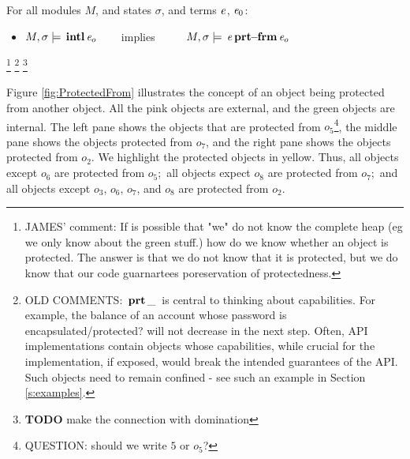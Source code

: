  
\begin{lemma}
\label{lemma:internalProtects}
For all modules $M$, and states $\sigma$, and terms $\mathit{e}$, $\mathit{e}_0$:
\begin{itemize}
\item  $M , \sigma \models {\ensuremath{\, \mathbf{intl}}\, \mathit{e}_o\, }$\ \ \ \ implies \ \ \ \ \  $M , \sigma \models {\ensuremath{\, {\mathit{e}}\, \mathbf{prt\!\!-\!\!frm}}\, {\mathit{e}_{o}}}$
\end{itemize}

\end{lemma}
 


\footnote{JAMES' comment: If is possible that "we" do not know the complete heap (eg we only know about the green stuff.) how do we know whether an object is protected. The answer is that we do not know that it is protected, but we do know that our code guarnartees poreservation of protectedness.
}
\footnote{
OLD COMMENTS: ${{\, \mathbf{prt}\, \_\, }}$  is central to thinking about capabilities. For example, the balance of an account whose
  password is  encapsulated/protected?  will not decrease in the next step.
  Often, API implementations contain objects whose capabilities, while  crucial for the implementation, if exposed,
would break the intended guarantees of the API. Such objects need to remain confined - see
such an example in Section \ref{s:examples}. 
}
\footnote{{\textbf{TODO} make the connection with domination}}

Figure \ref{fig:ProtectedFrom} illustrates the concept of an object being protected from another object. All the pink objects are external, and the green objects are internal. The left pane shows the objects that are protected from $o_5$\footnote{QUESTION: should we write $5$ or $o_5$?}, the middle pane shows the objects protected from $o_7$, and the right pane shows the objects protected from $o_2$. We highlight the protected objects in yellow. Thus, all objects except $o_6$ are protected from $o_5$;\ all objects expect $o_8$ are protected from $o_7$;\ and all objects except $o_3$, $o_6$, $o_7$, and $o_8$ are protected from $o_2$. 


